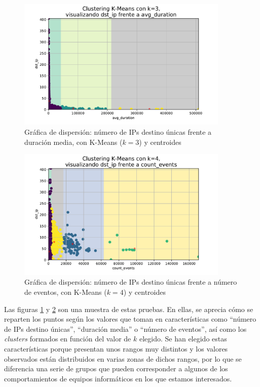 \begin{figure}[h]
    \centering
    \captionsetup{width=0.75\textwidth}
    \includegraphics[width=0.9\textwidth]{contenido/fig/dispersion-k3-dst_ip-vs-avg_duration.pdf}
    \caption{Gráfica de dispersión: número de IPs destino únicas frente a duración media, con K-Means ($k=3$) y centroides}
    \label{fig:scatterdstipavgduration}
\end{figure}

\begin{figure}[h]
    \centering
    \captionsetup{width=0.75\textwidth}
    \includegraphics[width=0.9\textwidth]{contenido/fig/dispersion-k4-dst_ip-vs-count_events.pdf}
    \caption{Gráfica de dispersión: número de IPs destino únicas frente a número de eventos, con K-Means ($k=4$) y centroides}
    \label{fig:scatterdstipcountevents}
\end{figure}

Las figuras \ref{fig:scatterdstipavgduration} y \ref{fig:scatterdstipcountevents} son una muestra de estas pruebas.
En ellas, se aprecia cómo se reparten los puntos según los valores que toman en características como ``número de IPs destino únicas'', ``duración media'' o ``número de eventos'',
así como los \emph{clusters} formados en función del valor de $k$ elegido.
Se han elegido estas características porque presentan unos rangos muy distintos y los valores observados están distribuidos en varias zonas de dichos rangos,
por lo que se diferencia una serie de grupos que pueden corresponder a algunos de los comportamientos de equipos informáticos en los que estamos interesados.

